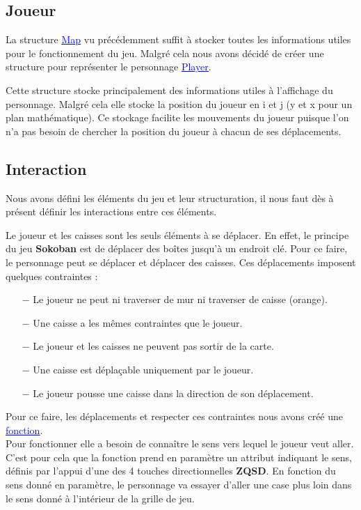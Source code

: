 \documentclass[french, 12pt]{article}
\begin{document}
   \subsection{Joueur}
       La structure \href{../doc/html/struct_map.html}{\textcolor{blue}{\underline{Map}}} vu précédemment suffit à stocker toutes les informations utiles pour le fonctionnement du jeu. Malgré cela nous avons décidé de créer une structure pour représenter le personnage \href{../doc/html/struct_player.html}{\textcolor{blue}{\underline{Player}}}.

       Cette structure stocke principalement des informations utiles à l'affichage du personnage. Malgré cela elle stocke la position du joueur en i et j (y et x pour un plan mathématique). Ce stockage facilite les mouvements du joueur puisque l'on n'a pas besoin de chercher la position du joueur à chacun de ses déplacements.


   \subsection{Interaction}
       Nous avons défini les éléments du jeu et leur structuration, il nous faut dès à présent définir les interactions entre ces éléments.

       Le joueur et les caisses sont les seuls éléments à se déplacer. En effet, le principe du jeu \textbf{Sokoban} est de déplacer des boîtes jusqu'à un endroit clé. Pour ce faire, le personnage peut se déplacer et déplacer des caisses. Ces déplacements imposent quelques contraintes :

       \begin{itemize}
           \item[$-$] Le joueur ne peut ni traverser de mur ni traverser de caisse (orange).
           \item[$-$] Une caisse a les mêmes contraintes que le joueur.
           \item[$-$] Le joueur et les caisses ne peuvent pas sortir de la carte.
           \item[$-$] Une caisse est déplaçable uniquement par le joueur.
           \item[$-$] Le joueur pousse une caisse dans la direction de son déplacement.
       \end{itemize}

       Pour ce faire, les déplacements et respecter ces contraintes nous avons créé une \href{../doc/html/move_8h.html}{\textcolor{blue}{\underline{fonction}}}. \\
       Pour fonctionner elle a besoin de connaître le sens vers lequel le joueur veut aller. C'est pour cela que la fonction prend en paramètre un attribut indiquant le sens, définis par l'appui d'une des 4 touches directionnelles \textbf{ZQSD}. En fonction du sens donné en paramètre, le personnage va essayer d'aller une case plus loin dans le sens donné à l'intérieur de la grille de jeu.\\
\end{document}
